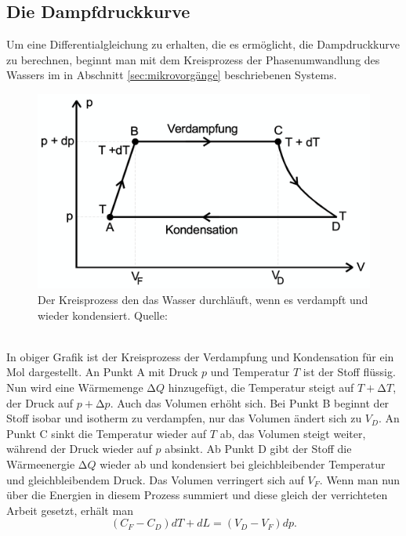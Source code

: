   \subsection{Die Dampfdruckkurve}
  \label{sec:dampfdruckkurve}
    Um eine Differentialgleichung zu erhalten, die es ermöglicht, die Dampdruckkurve zu berechnen, beginnt man mit dem
    Kreisprozess der Phasenumwandlung des Wassers im in Abschnitt \ref{sec:mikrovorgänge} beschriebenen Systems.
    \\
    \begin{figure}
      \centering
        \label{fig:kreisprozess}
          \includegraphics[scale=0.2]{Content/kreisprozess.png}
          \caption{Der Kreisprozess den das Wasser durchläuft, wenn es verdampft und wieder kondensiert. Quelle: \cite{AP01}}
    \end{figure}
    \\
    \noindent
    In obiger Grafik ist der Kreisprozess der Verdampfung und Kondensation für ein Mol dargestellt. An Punkt A mit Druck $p$ und
    Temperatur $T$ ist der Stoff flüssig. Nun wird eine Wärmemenge $\increment Q$ hinzugefügt, die Temperatur steigt auf
    $T + \increment T$, der Druck auf $p + \increment p$. Auch das Volumen erhöht sich. Bei Punkt B beginnt der Stoff isobar
    und isotherm zu verdampfen, nur das Volumen ändert sich zu $V_{D}$. An Punkt C sinkt die Temperatur wieder auf $T$ ab, das
    Volumen steigt weiter, während der Druck wieder auf $p$ absinkt. Ab Punkt D gibt der Stoff die Wärmeenergie $\increment Q$
    wieder ab und kondensiert bei gleichbleibender Temperatur und gleichbleibendem Druck. Das Volumen verringert sich auf
    $V_{F}$.
    Wenn man nun über die Energien in diesem Prozess summiert und diese gleich der verrichteten Arbeit gesetzt, erhält man
    \begin{equation*}
      \label{eqn:wärmeenergiearbeit}
      (C_{F} - C_{D})dT + dL = (V_{D} - V_{F})dp.
    \end{equation*}
